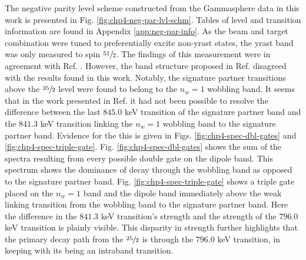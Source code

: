 The negative parity level scheme constructed from the Gammasphere data in this work is presented in Fig. \ref{fig:chp4-neg-par-lvl-schm}. Tables of level and transition information are found in Appendix \ref{app:neg-par-info}. As the beam and target combination were tuned to preferentially excite non-yrast states, the yrast band was only measured to spin $\sfrac{51}{2}$. The findings of this measurement were in agreement with Ref. \cite{ePaul135Pr}. However, the band structure proposed in Ref. \cite{semkow135Pr} disagreed with the results found in this work. Notably, the signature partner transitions above the $\sfrac{25}{2}$ level were found to belong to the $n_w=1$ wobbling band. It seems that in the work presented in Ref. \cite{semkow135Pr} it had not been possible to resolve the difference between the last $845.0$ keV transition of the signature partner band and the $841.3$ keV transition linking the $n_w=1$ wobbling band to the signature partner band. Evidence for the this is given in Figs. \ref{fig:chp4-spec-dbl-gates} and \ref{fig:chp4-spec-triple-gate}. Fig. \ref{fig:chp4-spec-dbl-gates} shows the sum of the spectra resulting from every possible double gate on the dipole band. This spectrum shows the dominance of decay through the wobbling band as opposed to the signature partner band. Fig. \ref{fig:chp4-spec-triple-gate} shows a triple gate placed on the $n_w=1$ band and the dipole band immediately above the weak linking transition from the wobbling band to the signature partner band. Here the difference in the $841.3$ keV transition's strength and the strength of the $796.0$ keV transition is plainly visible. This disparity in strength further highlights that the primary decay path from the $\sfrac{25}{2}$ is through the $796.0$ keV transition, in keeping with its being an intraband transition.

